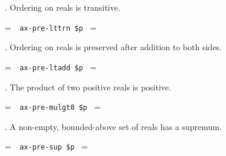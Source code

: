 . Ordering on reals is transitive.

\setbox\startprefix=\hbox{\tt \ \ ax-pre-lttrn\ \$p\ }
\setbox\contprefix=\hbox{\tt \ \ \ \ \ \ \ \ \ \ \ \ \ }
\startm
\m{\vdash}\m{(}\m{(}\m{\in}\m{\wedge}\m{\in}%
\m{\wedge}\m{\in}\m{)}\m{\rightarrow}\m{(}\m{(}\m{<}%
\m{\wedge}\m{<}\m{)}\m{\rightarrow}\m{<}\m{)}\m{)}
\endm

. Ordering on reals is preserved after addition to both sides.

\setbox\startprefix=\hbox{\tt \ \ ax-pre-ltadd\ \$p\ }
\setbox\contprefix=\hbox{\tt \ \ \ \ \ \ \ \ \ \ \ \ \ }
\startm
\m{\vdash}\m{(}\m{(}\m{\in}\m{\wedge}\m{\in}%
\m{\wedge}\m{\in}\m{)}\m{\rightarrow}\m{(}\m{<}\m{%
\rightarrow}\m{(}\m{+}\m{)}\m{<}\m{(}\m{+}\m{)}\m{)}\m{)}
\endm

. The product of two positive reals is positive.

\setbox\startprefix=\hbox{\tt \ \ ax-pre-mulgt0\ \$p\ }
\setbox\contprefix=\hbox{\tt \ \ \ \ \ \ \ \ \ \ \ \ \ \ }
\startm
\m{\vdash}\m{(}\m{(}\m{\in}\m{\wedge}\m{\in}%
\m{)}\m{\rightarrow}\m{(}\m{(}\m{<}\m{\wedge}%
\m{<}\m{)}\m{\rightarrow}\m{<}\m{(}\m{\cdot}\m{)}%
\m{)}\m{)}
\endm

. A non-empty, bounded-above set of reals has a supremum.

\setbox\startprefix=\hbox{\tt \ \ ax-pre-sup\ \$p\ }
\setbox\contprefix=\hbox{\tt \ \ \ \ \ \ \ \ \ \ \ }
\startm
\m{\vdash}\m{(}\m{(}\m{\subseteq}\m{\wedge}\m{\ne}\m{%
\varnothing}\m{\wedge}\m{\exists}\m{\in}\m{\forall}\m{%
\in}\m{<}\m{)}\m{\rightarrow}\m{\exists}\m{\in}\m{(}\m{\forall}\m{\in}\m{\lnot}\m{<}\m{\wedge}\m{%
\forall}\m{\in}\m{(}\m{<}\m{\rightarrow}\m{\exists}%
\m{\in}\m{<}\m{)}\m{)}\m{)}
\endm


